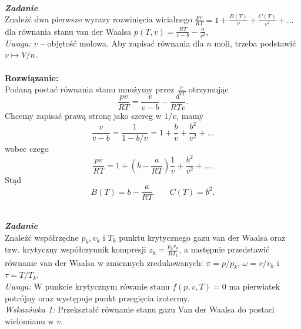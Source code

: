 \documentclass[11pt,a4paper]{article}
\newcounter{zadanie}\newcommand{\zadanie}[1][]{\addtocounter{zadanie}{1} ~\\  {\bf \emph{Zadanie \arabic{zadanie} #1 }} \\}
\begin{document}
\newpage
\zadanie
Znaleźć dwa pierwsze wyrazy rozwinięcia wirialnego 
$\displaystyle \frac{p v}{R T} = 1 + \frac{B(T)}{v} + \frac{C(T)}{v^2} + \ldots$ \\
dla równania stanu van der Waalsa
      $\displaystyle p(T,v) = \frac{R T}{v-b} - \frac{a}{v^2}$, \\
{\em Uwaga:} $v$ -- objętość molowa. 
Aby zapisać równania dla $n$ moli, trzeba podstawić $v \mapsto V/n$.\\
\\
\textbf{Rozwiązanie:}
\\
Podaną postać równania stanu mnożymy przez $\frac{v}{RT}$ otrzymując
\begin{equation*}
    \frac{pv}{RT}=\frac{v}{v-b}-\frac{a}{RTv}.
\end{equation*}
Chcemy zapisać prawą stronę jako szereg w $1/v$, mamy
\begin{equation*}
    \frac{v}{v-b}=\frac{1}{1-b/v}=1+\frac{b}{v}+\frac{b^2}{v^2}+\ldots
\end{equation*}
wobec czego
\begin{equation*}
    \frac{pv}{RT}=1+\left(b-\frac{a}{RT} \right) \frac{1}{v}+\frac{b^2}{v^2}+\ldots.
\end{equation*}
Stąd
\begin{equation*}
    B(T)=b-\frac{a}{RT} \qquad C(T)=b^2.
\end{equation*}


\newpage
\zadanie
Znaleźć współrzędne $p_k, v_k$ i $T_k$ punktu krytycznego
gazu van der Waalsa oraz tzw. krytyczny
współczynnik kompresji $\displaystyle z_k =\frac{p_k v_k}{R T_k}$,
a następnie przedstawić równanie van der Waalsa w
zmiennych zredukowanych: $\pi=p/p_k$, $\omega=v/v_k$ i $\tau=T/T_k$.\\

{\it Uwaga:} W punkcie krytycznym rówanie stanu $f(p,v,T)=0$ ma pierwiatek potrójny oraz występuje punkt przegięcia izotermy.\\

{\it Wskazówka 1:} Przekształć równanie stanu gazu Van der Waalsa do postaci wielomianu w $v$.\\
\end{document}
